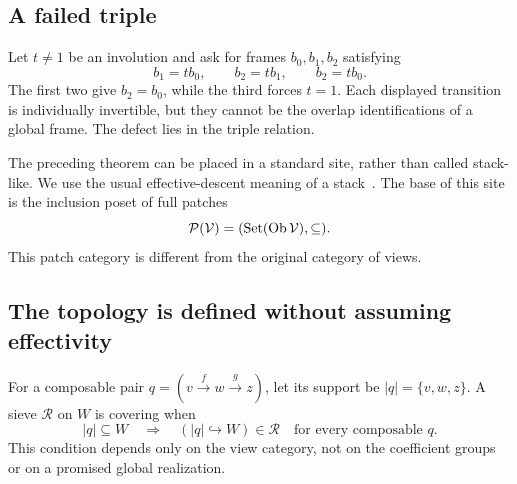 \subsection{A failed triple}
Let \(t\ne1\) be an involution and ask for frames \(b_0,b_1,b_2\) satisfying
\[
 b_1=tb_0,\qquad b_2=tb_1,\qquad b_2=tb_0.
\]
The first two give \(b_2=b_0\), while the third forces \(t=1\). Each displayed transition is individually invertible, but they cannot be the overlap identifications of a global frame. The defect lies in the triple relation.


\label{sec:stack}
The preceding theorem can be placed in a standard site, rather than called stack-like. We use the usual effective-descent meaning of a stack~\cite{stacks-stack,mathlib-stack}. The base of this site is the inclusion poset of full patches
\[
 \mathcal P(\mathcal V)=(\operatorname{Set}(\operatorname{Ob}\mathcal V),\subseteq).
\]
This patch category is different from the original category of views.

\subsection{The topology is defined without assuming effectivity}
For a composable pair \(q=(v\xrightarrow f w\xrightarrow g z)\), let its support be \(|q|=\{v,w,z\}\). A sieve \(\mathcal R\) on \(W\) is covering when
\begin{equation}\label{eq:site}
 |q|\subseteq W\quad\Longrightarrow\quad
 (|q|\hookrightarrow W)\in\mathcal R
 \quad\text{for every composable }q.
\end{equation}
This condition depends only on the view category, not on the coefficient groups or on a promised global realization.

